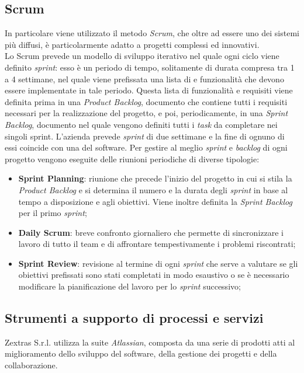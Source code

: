 \subsection{Scrum}
In particolare  viene utilizzato il metodo \emph{Scrum}, che oltre ad essere uno dei sistemi più diffusi, è particolarmente adatto a progetti complessi ed innovativi.\\
Lo Scrum prevede un modello di sviluppo iterativo nel quale ogni ciclo viene definito \emph{sprint}: esso è un periodo di tempo, solitamente di durata compresa tra 1 a 4 settimane, nel quale viene prefissata una lista di  e funzionalità che devono essere implementate in tale periodo.
Questa lista di funzionalità e requisiti viene definita prima in una \emph{Product Backlog}, documento che contiene tutti i requisiti necessari per la realizzazione del progetto, e poi, periodicamente, in una \emph{Sprint Backlog}, documento nel quale vengono definiti tutti i \emph{task} da completare nei singoli sprint.
L'azienda prevede \emph{sprint} di due settimane e la fine di ognuno di essi coincide con una  del software.
Per gestire al meglio \emph{sprint} e \emph{backlog} di ogni progetto vengono eseguite delle riunioni periodiche di diverse tipologie:
\begin{itemize}
	\item \textbf{Sprint Planning}: riunione che precede l'inizio del progetto in cui si stila la \emph{Product Backlog} e si determina il numero e la durata degli \emph{sprint} in base al tempo a disposizione e agli obiettivi. Viene inoltre definita la \emph{Sprint Backlog} per il primo \emph{sprint};
	\item \textbf{Daily Scrum}: breve confronto giornaliero che permette di sincronizzare i lavoro di tutto il team e di affrontare tempestivamente i problemi riscontrati;
	\item \textbf{Sprint Review}: revisione al termine di ogni \emph{sprint} che serve a valutare se gli obiettivi prefissati sono stati completati in modo esaustivo o se è necessario modificare la pianificazione del lavoro per lo \emph{sprint} successivo;
\end{itemize}

\subsection{Strumenti a supporto di processi e servizi}
Zextras S.r.l. utilizza la suite \emph{Atlassian}, composta da una serie di prodotti atti al miglioramento dello sviluppo del software, della gestione dei progetti e della collaborazione. 
